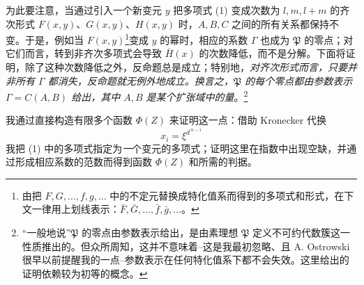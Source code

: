 为此要注意，当通过引入一个新变元 $y$ 把多项式 (1) 变成次数为 $l,m,l+m$ 的齐次形式 $F(x,y)$、$G(x,y)$、$H(x,y)$ 时，$A,B,C$ 之间的所有关系都保持不变。于是，例如当 $F(x,y)$\footnote{由把 $F,G,\ldots,f,g,\ldots$ 中的不定元替换成特化值系而得到的多项式和形式，在下文一律用上划线表示：$\bar F,\bar G,\ldots,\bar f,\bar g,\ldots$。}变成 $y$ 的幂时，相应的系数 $\Gamma$ 也成为 $\mathfrak P$ 的零点；对它们而言，转到非齐次多项式会导致 $\bar H(x)$ 的次数降低，而不是分解。下面将证明，除了这种次数降低之外，反命题总是成立；特别地，\emph{对齐次形式而言，只要并非所有 $\Gamma$ 都消失，反命题就无例外地成立。换言之，$\mathfrak P$ 的每个零点都由参数表示 $\Gamma=C(A,B)$ 给出，其中 $A,B$ 是某个扩张域中的量}。\footnote{“一般地说”$\mathfrak P$ 的零点由参数表示给出，是由素理想 $\mathfrak P$ 定义不可约代数簇这一性质推出的。但众所周知，这并不意味着--这是我最初忽略、且 A. Ostrowski 很早以前提醒我的一点--参数表示在任何特化值系下都不会失效。这里给出的证明依赖较为初等的概念。}

我通过直接构造有限多个函数 $\Phi(Z)$ 来证明这一点：借助 Kronecker 代换
\[
 x_i=\xi^{d^{\,n-i}}
\]
我把 (1) 中的多项式指定为\emph{一}个变元的多项式；证明这里在指数中出现空缺，并通过形成相应系数的范数而得到函数 $\Phi(Z)$ 和所需的判据。

